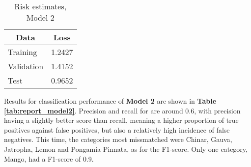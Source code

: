 \documentclass[11pt]{article}
\begin{document}
\begin{table}[H]
    \begin{center}
    
    \begin{tabular}{lc}
    \multicolumn{1}{c}{\textbf{Data}} & \multicolumn{1}{c}{\textbf{Loss}} \\ \hline
        Training & 1.2427 \\
        Validation  & 1.4152 \\
        Test  & 0.9652 \\ \hline
    \end{tabular}
    \caption{Risk estimates, Model 2} \label{tab:model2_results}
    
    \end{center}
\end{table}

Results for classification performance of \textbf{Model 2} are shown in \textbf{Table \ref{tab:report_model2}}.  Precision and recall for  are around 0.6, with precision having a slightly better score than recall, meaning a higher proportion of true positives against false positives, but also a relatively high incidence of false negatives. This time, the categories most missmatched were Chinar, Gauva, Jatropha, Lemon and Pongamia Pinnata, as for the F1-score. Only one category, Mango, had a F1-score of 0.9.\\
\end{document}
